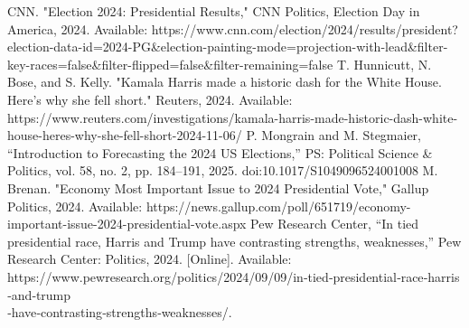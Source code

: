 \documentclass[letter]{article}
\begin{document}
\newpage
\begin{thebibliography}{00}
 CNN. "Election 2024: Presidential Results," CNN Politics, Election Day in America, 2024. Available: https://www.cnn.com/election/2024/results/president?election-data-id=2024-PG\&election-painting-mode=projection-with-lead\&filter-key-races=false\&filter-flipped=false\&filter-remaining=false
 T. Hunnicutt, N. Bose, and S. Kelly. "Kamala Harris made a historic dash for the White House. Here’s why she fell short." Reuters, 2024. Available: https://www.reuters.com/investigations/kamala-harris-made-historic-dash-white-house-heres-why-she-fell-short-2024-11-06/
 P. Mongrain and M. Stegmaier, “Introduction to Forecasting the 2024 US Elections,” PS: Political Science \& Politics, vol. 58, no. 2, pp. 184–191, 2025. doi:10.1017/S1049096524001008
 M. Brenan. "Economy Most Important Issue to 2024 Presidential Vote," Gallup Politics, 2024. Available: https://news.gallup.com/poll/651719/economy-important-issue-2024-presidential-vote.aspx
 Pew Research Center, “In tied presidential race, Harris and Trump have contrasting strengths, weaknesses,” Pew Research Center: Politics, 2024. [Online]. Available: https://www.pewresearch.org/politics/2024/09/09/in‑tied‑presidential‑race‑harris‑and‑trump\\‑have‑contrasting‑strengths‑weaknesses/.


\end{thebibliography}
\end{document}
